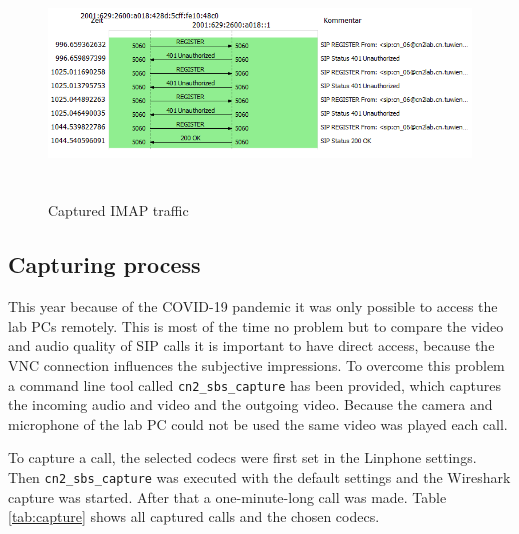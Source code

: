 \documentclass[parskip=full]{scrartcl}
\begin{document}
\begin{figure}[!ht]
	\centering %
	\includegraphics[height=6cm]{images/sip_flowseq.png} %
	\caption{Captured IMAP traffic} 
	\label{fig:ws} %
\end{figure} 



\subsection{Capturing process} \label{subsec:capture}
This year because of the COVID-19 pandemic it was only possible to access the lab PCs remotely.
This is most of the time no problem but to compare the video and audio quality of SIP calls it is important to have direct access, because the VNC connection influences the subjective impressions.
To overcome this problem a command line tool called \verb|cn2_sbs_capture| has been provided, which captures the incoming audio and video and the outgoing video.
Because the camera and microphone of the lab PC could not be used the same video was played each call.

To capture a call, the selected codecs were first set in the Linphone settings. 
Then \verb|cn2_sbs_capture| was executed with the default settings and the Wireshark capture was started. 
After that a one-minute-long call was made. 
Table \ref{tab:capture} shows all captured calls and the chosen codecs.
\end{document}
